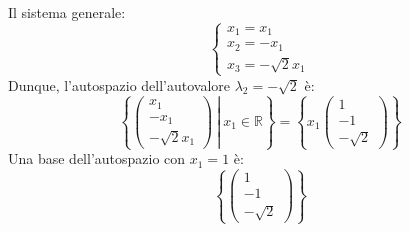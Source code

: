 \documentclass[a4paper]{article}
\begin{document}
	Il sistema generale:
	\begin{equation*}
		\begin{cases}
			x_{1} = x_{1} \\
			x_{2} = -x_{1} \\
			x_{3} = -\sqrt{2}x_{1}
		\end{cases}
	\end{equation*}
	Dunque, l'autospazio dell'autovalore $\lambda_{2} = -\sqrt{2}$ è:
	\begin{equation*}
		\left\{\left. \begin{pmatrix}
			x_{1} \\
			-x_{1} \\
			-\sqrt{2}x_{1}
		\end{pmatrix} \: \right| \: x_{1} \in \mathbb{R}\right\} =
		\left\{x_{1} \begin{pmatrix}
			1 \\ -1 \\ -\sqrt{2}
		\end{pmatrix}\right\}
	\end{equation*}
	Una base dell'autospazio con $x_{1} = 1$ è:
	\begin{equation*}
		\left\{\begin{pmatrix}
			1 \\ -1 \\ -\sqrt{2}
		\end{pmatrix}\right\}
	\end{equation*}\newpage
	
\end{document}
